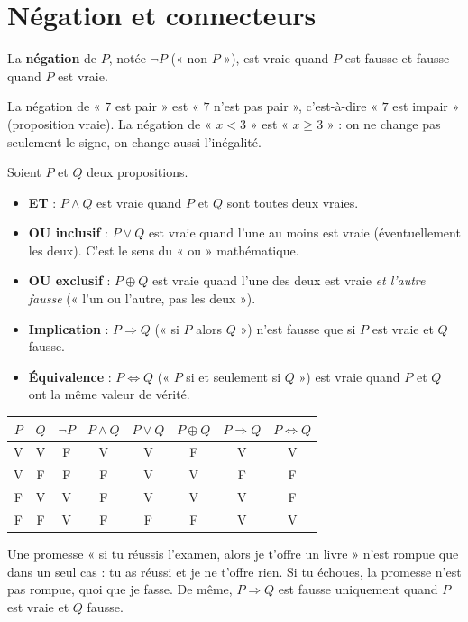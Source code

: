 \section{Négation et connecteurs}
\begin{definition}[Négation]
La \textbf{négation} de $P$, notée $\lnot P$ (« non $P$ »), est vraie quand $P$ est fausse et fausse quand $P$ est vraie.
\end{definition}
\begin{example}
La négation de « $7$ est pair » est « $7$ n'est pas pair », c'est-à-dire « $7$ est impair » (proposition vraie). La négation de « $x<3$ » est « $x\ge3$ » : on ne change pas seulement le signe, on change aussi l'inégalité.
\end{example}
\begin{definition}[Connecteurs]
Soient $P$ et $Q$ deux propositions.
\begin{itemize}
\item \textbf{ET} : $P\land Q$ est vraie quand $P$ et $Q$ sont toutes deux vraies.
\item \textbf{OU inclusif} : $P\lor Q$ est vraie quand l'une au moins est vraie (éventuellement les deux). C'est le sens du « ou » mathématique.
\item \textbf{OU exclusif} : $P\oplus Q$ est vraie quand l'une des deux est vraie \emph{et l'autre fausse} (« l'un ou l'autre, pas les deux »).
\item \textbf{Implication} : $P\Rightarrow Q$ (« si $P$ alors $Q$ ») n'est fausse que si $P$ est vraie et $Q$ fausse.
\item \textbf{Équivalence} : $P\Leftrightarrow Q$ (« $P$ si et seulement si $Q$ ») est vraie quand $P$ et $Q$ ont la même valeur de vérité.
\end{itemize}
\end{definition}
\begin{center}
\begin{tabular}{c|c||c|c|c|c|c|c}
$P$ & $Q$ & $\lnot P$ & $P\land Q$ & $P\lor Q$ & $P\oplus Q$ & $P\Rightarrow Q$ & $P\Leftrightarrow Q$\\\hline
V & V & F & V & V & F & V & V\\
V & F & F & F & V & V & F & F\\
F & V & V & F & V & V & V & F\\
F & F & V & F & F & F & V & V
\end{tabular}
\end{center}
\begin{keypoint}
Une promesse « si tu réussis l'examen, alors je t'offre un livre » n'est rompue que dans un seul cas : tu as réussi et je ne t'offre rien. Si tu échoues, la promesse n'est pas rompue, quoi que je fasse. De même, $P\Rightarrow Q$ est fausse uniquement quand $P$ est vraie et $Q$ fausse.
\end{keypoint}
